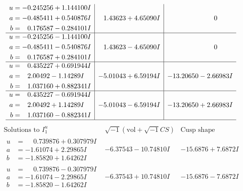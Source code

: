 \documentclass[1p]{elsarticle_modified}
\theoremstyle{definition}
\newcommand{\I}{\sqrt{-1}}
\begin{document}
$$\begin{array}{c|c|c}
\begin{aligned}
u &= -0.245256 + 1.144100 I \\
a &= -0.485411 + 0.540876 I \\
b &= \phantom{-}0.176587 - 0.284101 I\end{aligned}
 & \phantom{-}1.43623 + 4.65090 I & \phantom{-0.000000 } 0 \\ \hline\begin{aligned}
u &= -0.245256 - 1.144100 I \\
a &= -0.485411 - 0.540876 I \\
b &= \phantom{-}0.176587 + 0.284101 I\end{aligned}
 & \phantom{-}1.43623 - 4.65090 I & \phantom{-0.000000 } 0 \\ \hline\begin{aligned}
u &= \phantom{-}0.435227 + 0.691944 I \\
a &= \phantom{-}2.00492 - 1.14289 I \\
b &= \phantom{-}1.037160 + 0.882341 I\end{aligned}
 & -5.01043 + 6.59194 I & -13.20650 - 2.66983 I \\ \hline\begin{aligned}
u &= \phantom{-}0.435227 - 0.691944 I \\
a &= \phantom{-}2.00492 + 1.14289 I \\
b &= \phantom{-}1.037160 - 0.882341 I\end{aligned}
 & -5.01043 - 6.59194 I & -13.20650 + 2.66983 I\\
 \hline 
 \end{array}$$\newpage$$\begin{array}{c|c|c}  
\text{Solutions to }I^u_{1}& \I (\text{vol} + \sqrt{-1}CS) & \text{Cusp shape}\\
 \hline 
\begin{aligned}
u &= \phantom{-}0.739876 + 0.307979 I \\
a &= -1.61074 + 2.29865 I \\
b &= -1.85820 + 1.64262 I\end{aligned}
 & -6.37543 - 10.74810 I & -15.6876 + 7.6872 I \\ \hline\begin{aligned}
u &= \phantom{-}0.739876 - 0.307979 I \\
a &= -1.61074 - 2.29865 I \\
b &= -1.85820 - 1.64262 I\end{aligned}
 & -6.37543 + 10.74810 I & -15.6876 - 7.6872 I \\ \hline\begin{aligned}

\end{aligned}
\end{array}$$
\end{document}
